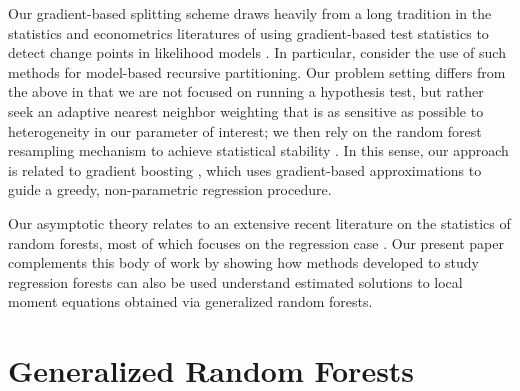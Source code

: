 \documentclass[aos]{imsart}
\theoremstyle{plain}
\theoremstyle{definition}
\theoremstyle{remark}
\begin{document}
\begin{CJK}{UTF8}{gbsn}
Our gradient-based splitting scheme draws heavily from a long tradition in the statistics and
econometrics literatures of using gradient-based test statistics to detect change points in likelihood models
\citep{andrews1993tests,hansen1992testing,hjort2002tests,nyblom1989testing,
ploberger1992cusum,zeileis2005unified,zeileis2007generalized}.
In particular, \citet{zeileis2008model} consider the use of such methods for
model-based recursive partitioning. Our problem setting differs from the above
in that we are not focused on running a hypothesis test, but rather seek an adaptive
nearest neighbor weighting that is as sensitive as possible to heterogeneity in our
parameter of interest; we then rely on the random forest resampling mechanism
to achieve statistical stability \citep{mentch2016quantifying,scornet2015consistency,wager2015estimation}.
In this sense, our approach is related to gradient boosting
\citep{friedman2001greedy}, which uses gradient-based approximations to guide
a greedy, non-parametric regression procedure.

Our asymptotic theory relates to an extensive recent literature on the statistics of random forests, most
of which focuses on the regression case
\citep{arlot2014analysis,biau2012analysis,biau2008consistency,biau2016random,
buhlmann2002analyzing,denil2014narrowing,geurts2006extremely,
ishwaran2010consistency,lin2006random,meinshausen2006quantile,mentch2016quantifying,
scornet2015consistency,sexton2009standard,wager2015estimation,wager2015uniform,zhu2015reinforcement}.
Our present paper complements this body of work by showing how methods developed
to study regression forests can also be used understand estimated solutions to local
moment equations obtained via generalized random forests.


\section{Generalized Random Forests}


\end{CJK}
\end{document}
